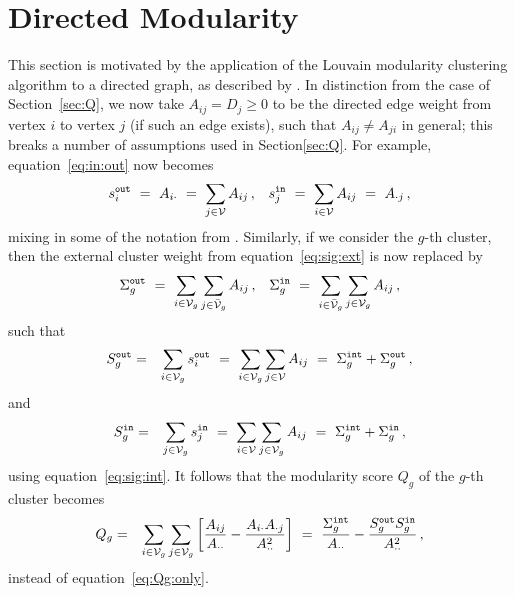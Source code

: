 \documentclass[a4paper]{article}
\begin{document}
\section{Directed Modularity}
This section is motivated by the application of the Louvain modularity clustering algorithm to a directed graph,
as described by \cite{browet14}.
In distinction from the case of Section~\ref{sec:Q}, we now take $A_{ij}=D_{j}\ge 0$ to be the directed edge weight from vertex $i$ to vertex $j$ (if such an
edge exists), such that $A_{ij}\ne A_{ji}$ in general; this breaks a number of assumptions used in Section\ref{sec:Q}.
For example, equation~\eqref{eq:in:out} now becomes
\begin{eqnarray}
  s^{\tt out}_i~=~A_{i\cdot}~=~\sum_{j\in{\cal V}} A_{ij}\,,&&
  s^{\tt in}_j~=~\sum_{i\in{\cal V}} A_{ij}~=~A_{\cdot j}\,,
\end{eqnarray}
mixing in some of the notation from \cite{browet14}.
Similarly, if we consider the $g$-th cluster, then the external cluster weight from equation~\eqref{eq:sig:ext} is now replaced by
\begin{eqnarray}
   \Sigma_g^{\tt out}~=~\sum_{i\in{\cal V}_g}\sum_{j\in\bar{\cal V}_g} A_{ij}\,, && 
   \Sigma_g^{\tt in}~=~\sum_{i\in\bar{\cal V}_g}\sum_{j\in{\cal V}_g} A_{ij}\,,
\end{eqnarray}
such that
\begin{eqnarray}
   S^{\tt out}_g & = & \sum_{i\in{\cal V}_g} s^{\tt out}_i~=~\sum_{i\in{\cal V}_g}\sum_{j\in{\cal V}}A_{ij}~=~\Sigma_g^{\tt int}+\Sigma_g^{\tt out}\,,
\end{eqnarray}
and
\begin{eqnarray}
   S^{\tt in}_g & = & \sum_{j\in{\cal V}_g} s^{\tt in}_j~=~\sum_{i\in{\cal V}}\sum_{j\in{\cal V}_g}A_{ij}~=~\Sigma_g^{\tt int}+\Sigma_g^{\tt in}\,,
\end{eqnarray}
using equation~\eqref{eq:sig:int}.
It follows that the modularity score $Q_g$ of the $g$-th cluster becomes
\begin{eqnarray}
   Q_g & = & \sum_{i\in{\cal V}_g}\sum_{j\in{\cal V}_g} \left[
  \frac{A_{ij}}{A_{\cdot\cdot}}-
  \frac{A_{i\cdot}A_{\cdot j}}{A_{\cdot\cdot}^2}
  \right]
~=~    \frac{\Sigma_g^{\tt int}}{A_{\cdot\cdot}}
    -\frac{S_g^{\tt out}S_g^{\tt in}}{A_{\cdot\cdot}^2}\,,
\end{eqnarray}
instead of equation~\eqref{eq:Qg:only}.
\end{document}
